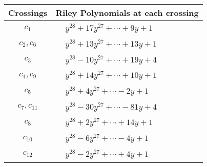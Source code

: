 \documentclass[1p]{elsarticle_modified}
\theoremstyle{definition}
\begin{document}
\begin{tabular}{m{50pt}|m{274pt}}
Crossings & \hspace{64pt}Riley Polynomials at each crossing \\
\hline $$\begin{aligned}c_{1}\end{aligned}$$&$\begin{aligned}
&y^{28}+17 y^{27}+\cdots+9 y+1
\end{aligned}$\\
\hline $$\begin{aligned}c_{2},c_{6}\end{aligned}$$&$\begin{aligned}
&y^{28}+13 y^{27}+\cdots+13 y+1
\end{aligned}$\\
\hline $$\begin{aligned}c_{3}\end{aligned}$$&$\begin{aligned}
&y^{28}-10 y^{27}+\cdots+19 y+4
\end{aligned}$\\
\hline $$\begin{aligned}c_{4},c_{9}\end{aligned}$$&$\begin{aligned}
&y^{28}+14 y^{27}+\cdots+10 y+1
\end{aligned}$\\
\hline $$\begin{aligned}c_{5}\end{aligned}$$&$\begin{aligned}
&y^{28}+4 y^{27}+\cdots-2 y+1
\end{aligned}$\\
\hline $$\begin{aligned}c_{7},c_{11}\end{aligned}$$&$\begin{aligned}
&y^{28}-30 y^{27}+\cdots-81 y+4
\end{aligned}$\\
\hline $$\begin{aligned}c_{8}\end{aligned}$$&$\begin{aligned}
&y^{28}+2 y^{27}+\cdots+14 y+1
\end{aligned}$\\
\hline $$\begin{aligned}c_{10}\end{aligned}$$&$\begin{aligned}
&y^{28}-6 y^{27}+\cdots-4 y+1
\end{aligned}$\\
\hline $$\begin{aligned}c_{12}\end{aligned}$$&$\begin{aligned}
&y^{28}-2 y^{27}+\cdots+4 y+1
\end{aligned}$\\
\hline
\end{tabular}\\~\\
\end{document}
